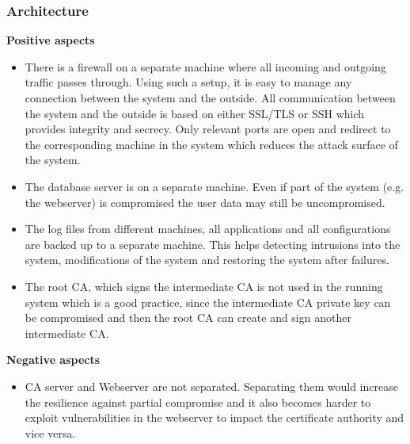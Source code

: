 \documentclass[english]{article}
\begin{document}
\subsubsection{Architecture}
\textbf{Positive aspects}
\begin{itemize}
\item There is a firewall on a separate machine where all incoming and outgoing traffic passes through. Using such a setup, it is easy to manage any connection between the system and the outside. All communication between the system and the outside is based on either SSL/TLS or SSH which provides integrity and secrecy. Only relevant ports are open and redirect to the corresponding machine in the system which reduces the attack surface of the system.
\item The database server is on a separate machine. Even if part of the system (e.g. the webserver) is compromised the user data may still be uncompromised.
\item The log files from different machines, all applications and all configurations are backed up to a separate machine. This helps detecting intrusions into the system, modifications of the system and restoring the system after failures.
\item The root CA, which signs the intermediate CA is not used in the running system which is a good practice, since the intermediate CA private key can be compromised and then the root CA can create and sign another intermediate CA.
  
\end{itemize}

\textbf{Negative aspects}
\begin{itemize}
\item CA server and Webserver are not separated. Separating them would increase the resilience against partial compromise and it also becomes harder to exploit vulnerabilities in the webserver to impact the certificate authority and vice versa.
\end{itemize}
\end{document}
